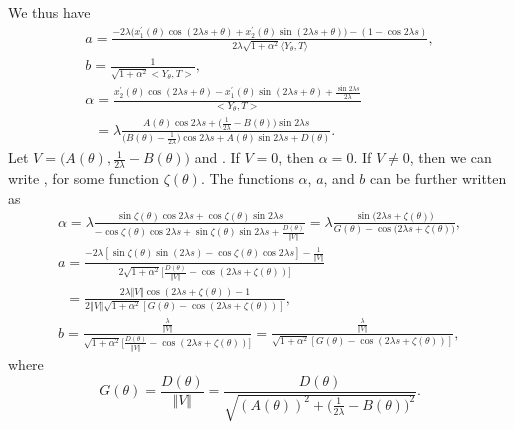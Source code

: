 \documentclass[pdftex]{sigma}
\numberwithin{equation}{section}
\begin{document}
We thus have
\begin{gather}
a =\frac{-2\lambda \bigl( x^{\prime }_{1}( \theta ) \cos (
2\lambda s+\theta ) +x^{\prime }_{2}( \theta ) \sin (
2\lambda s+\theta ) \bigr) -( 1-\cos 2\lambda s) }{
2\lambda \sqrt{1+\alpha ^{2}} \langle Y_{\theta },T \rangle },\nonumber \\
b =\frac{1}{\sqrt{1+\alpha ^{2}}\big<Y_{\theta },T\big>}, \nonumber\\
\alpha =\frac{x_{2}^{\prime }(\theta )\cos {(2\lambda s+\theta )}
-x_{1}^{\prime }(\theta )\sin {(2\lambda s+\theta )}+\frac{\sin {2\lambda s}
}{2\lambda }}{\big<Y_{\theta },T\big>} \nonumber\\
\phantom{\alpha}{} =\lambda \frac{A(\theta )\cos {2\lambda s}+\bigl( \frac{1}{2\lambda }
-B(\theta )\bigr) \sin {2\lambda s}}{\bigl( B(\theta )-\frac{1}{2\lambda }
\bigr) \cos {2\lambda s}+A(\theta )\sin {2\lambda s}+D(\theta )}.\label{forinv}
\end{gather}
Let $V=\bigl( A(\theta ),\frac{1}{2\lambda }-B(\theta )\bigr) $ and .
If $V=0$, then $\alpha=0$. If $V\neq 0$, then we can write
,
for some function $\zeta {(\theta )}$. The functions $\alpha $, $a$, and $b$
can be further written as
\begin{gather*}%
\alpha =\lambda \frac{\sin {\zeta (\theta )}\cos {2\lambda s}+\cos {\zeta
(\theta )}\sin {2\lambda s}}{-\cos {\zeta (\theta )}\cos {2\lambda s}+\sin {
\zeta (\theta )}\sin {2\lambda s}+\frac{D(\theta )}{ \Vert V
\Vert }} =\lambda \frac{\sin {\bigl(2\lambda s+\zeta {(\theta )}\bigr)}}{G(\theta
)-\cos {\bigl(2\lambda s+\zeta {(\theta )}\bigr)}}, \\
a=\frac{-2\lambda [ \sin \zeta ( \theta ) \sin (
2\lambda s) -\cos \zeta ( \theta ) \cos 2\lambda s] -
\frac{1}{\Vert V \Vert }}{2\sqrt{1+\alpha ^{2}}\bigl[ \frac{
D( \theta ) }{\Vert V \Vert }-\cos ( 2\lambda
s+\zeta ( \theta ) ) \bigr] } \\
\phantom{a}{} =\frac{2\lambda \Vert V \Vert \cos ( 2\lambda s+\zeta
( \theta ) ) -1}{2\Vert V \Vert \sqrt{1+\alpha
^{2}}[ G( \theta ) -\cos ( 2\lambda s+\zeta (
\theta ) ) ] }, \\
b =\frac{\frac{\lambda }{\Vert V \Vert }}{\sqrt{1+\alpha ^{2}}
\bigl[ \frac{D( \theta ) }{\Vert V \Vert }-\cos
( 2\lambda s+\zeta ( \theta ) ) \bigr] } =\frac{\frac{\lambda }{\Vert V \Vert }}{\sqrt{1+\alpha ^{2}}
[ G( \theta ) -\cos ( 2\lambda s+\zeta ( \theta
) ) ] },
\end{gather*}
where
\begin{equation}\label{gdefn}
G(\theta )=\frac{D(\theta )}{\Vert V \Vert }=\frac{D(\theta )}{
\sqrt{(A(\theta ))^{2}+\bigl(\frac{1}{2\lambda }-B(\theta )\bigr)^{2}}}.
\end{equation}
\end{document}
